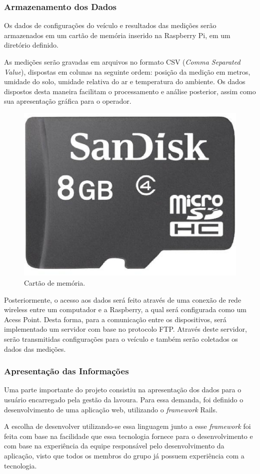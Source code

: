  \subsubsection{Armazenamento dos Dados}
  Os dados de configurações do veículo e resultados das medições serão armazenados
  em um cartão de memória inserido na Raspberry Pi, em um diretório definido.

  As medições serão gravadas em arquivos no formato CSV (\textit{Comma Separated Value}),
  dispostas em colunas na seguinte ordem: posição da medição
  em metros, umidade do solo, umidade relativa do ar e temperatura do
  ambiente.
  Os dados dispostos desta maneira facilitam o processamento e
  análise posterior, assim como sua apresentação gráfica para
  o operador.

  \begin{figure}[!htbp]
  \begin{center}
  \includegraphics[width=.2\textwidth]{figuras/sdcard.eps}
  \caption{\label{fig:sdcard}Cartão de memória.}
  \end{center}
  \end{figure}

  Posteriormente, o acesso aos dados será feito através de uma conexão de  rede
  wireless entre um computador e a Raspberry, a qual será configurada como
  um Acess Point. Desta forma, para a comunicação entre os
  dispositivos, será implementado um servidor com base no protocolo FTP. Através
  deste servidor, serão transmitidas configurações para o veículo e também serão
  coletados os dados das medições.

  \subsubsection{Apresentação das Informações}

  Uma parte importante do projeto consistiu na apresentação dos
  dados para o usuário encarregado pela gestão da lavoura. Para essa demanda,
  foi definido o desenvolvimento de uma aplicação web, utilizando
  o \textit{framework} Rails.

  A escolha de desenvolver utilizando-se essa linguagem junto a
  esse \textit{framework} foi feita com base na facilidade que essa
  tecnologia fornece para o desenvolvimento e com base na experiência
  da equipe responsável pelo desenvolvimento da aplicação, visto que
  todos os membros do grupo já possuem experiência com a tecnologia.

